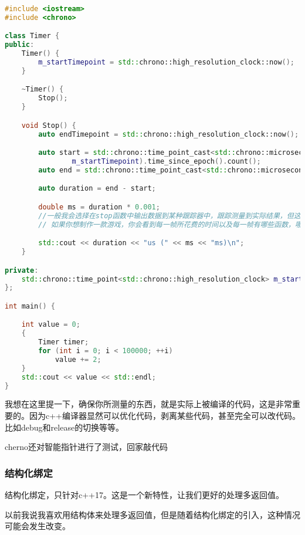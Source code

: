 \begin{lstlisting}[language=c++]
#include <iostream>
#include <chrono>

class Timer {
public:
    Timer() {
        m_startTimepoint = std::chrono::high_resolution_clock::now();
    }

    ~Timer() {
        Stop();
    }

    void Stop() {
        auto endTimepoint = std::chrono::high_resolution_clock::now();

        auto start = std::chrono::time_point_cast<std::chrono::microseconds>(
                m_startTimepoint).time_since_epoch().count();
        auto end = std::chrono::time_point_cast<std::chrono::microseconds>(endTimepoint).time_since_epoch().count();

        auto duration = end - start;

        double ms = duration * 0.001;
        //一般我会选择在stop函数中输出数据到某种跟踪器中，跟踪测量到实际结果，但这是一个非常大的系统，他输出所有的数据到一个文件，做很多事情，这样你就可以查看了，在单独的工具中，查看程序中所有的内容消耗的时间
        // 如果你想制作一款游戏，你会看到每一帧所花费的时间以及每一帧有哪些函数，哪些耗时比较多，这会在其他课程内讲到，但是现在我们要输出程序运行时间

        std::cout << duration << "us (" << ms << "ms)\n";
    }

private:
    std::chrono::time_point<std::chrono::high_resolution_clock> m_startTimepoint;
};

int main() {

    int value = 0;
    {
        Timer timer;
        for (int i = 0; i < 100000; ++i)
            value += 2;
    }
    std::cout << value << std::endl;
}
\end{lstlisting}
我想在这里提一下，确保你所测量的东西，就是实际上被编译的代码，这是非常重要的。因为c++编译器显然可以优化代码，剥离某些代码，甚至完全可以改代码。比如{\ncodestyle debug}和{\ncodestyle release}的切换等等。

cherno还对智能指针进行了测试，回家敲代码


\subsubsection{结构化绑定}


结构化绑定，只针对c++17。这是一个新特性，让我们更好的处理多返回值。

以前我说我喜欢用结构体来处理多返回值，但是随着结构化绑定的引入，这种情况可能会发生改变。

